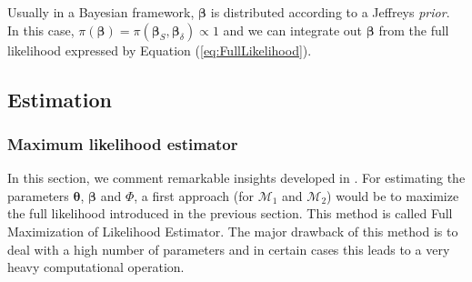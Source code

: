 \documentclass[soumission]{jsfds}
\newcommand{\EqRef}[1] {Equation (\ref{#1})}
\edef\hc{\string: }
\begin{document}
Usually in a Bayesian framework, $\boldsymbol{\beta}$ is distributed according to a Jeffreys \textit{prior}. In this case, $\pi(\boldsymbol{\beta})=\pi(\boldsymbol{\beta}_S,\boldsymbol{\beta}_{\delta})\propto 1$ and we can integrate out $\boldsymbol{\beta}$ from the full likelihood expressed by \EqRef{eq:FullLikelihood}.

\subsection{Estimation \label{sec:estimation}}

\subsubsection{Maximum likelihood estimator}

In this section, we comment remarkable insights developed in \citet{cox2001}. For estimating the parameters $\boldsymbol{\theta}$, $\boldsymbol{\beta}$ and $\Phi$,
a first approach (for $\mathcal{M}_1$ and $\mathcal{M}_2$) would be to maximize the full likelihood introduced in the previous section. This method is called Full Maximization of Likelihood Estimator.
The major drawback of this method is to deal with a high number of parameters and in certain cases this leads to a very heavy computational operation. \newline
\end{document}
